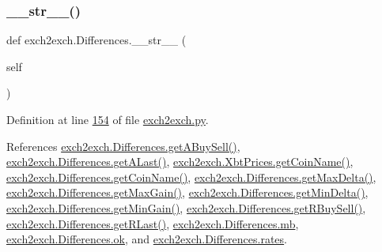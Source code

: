 \subsubsection{\texorpdfstring{\+\_\+\+\_\+str\+\_\+\+\_\+()}{\_\_str\_\_()}}
{\footnotesize\ttfamily def exch2exch.\+Differences.\+\_\+\+\_\+str\+\_\+\+\_\+ (\begin{DoxyParamCaption}\item[{}]{self }\end{DoxyParamCaption})}



Definition at line \hyperlink{exch2exch_8py_source_l00154}{154} of file \hyperlink{exch2exch_8py_source}{exch2exch.\+py}.



References \hyperlink{exch2exch_8py_source_l00139}{exch2exch.\+Differences.\+get\+A\+Buy\+Sell()}, \hyperlink{exch2exch_8py_source_l00145}{exch2exch.\+Differences.\+get\+A\+Last()}, \hyperlink{exch2exch_8py_source_l00088}{exch2exch.\+Xbt\+Prices.\+get\+Coin\+Name()}, \hyperlink{exch2exch_8py_source_l00151}{exch2exch.\+Differences.\+get\+Coin\+Name()}, \hyperlink{exch2exch_8py_source_l00130}{exch2exch.\+Differences.\+get\+Max\+Delta()}, \hyperlink{exch2exch_8py_source_l00136}{exch2exch.\+Differences.\+get\+Max\+Gain()}, \hyperlink{exch2exch_8py_source_l00127}{exch2exch.\+Differences.\+get\+Min\+Delta()}, \hyperlink{exch2exch_8py_source_l00133}{exch2exch.\+Differences.\+get\+Min\+Gain()}, \hyperlink{exch2exch_8py_source_l00142}{exch2exch.\+Differences.\+get\+R\+Buy\+Sell()}, \hyperlink{exch2exch_8py_source_l00148}{exch2exch.\+Differences.\+get\+R\+Last()}, \hyperlink{exch2exch_8py_source_l00108}{exch2exch.\+Differences.\+mb}, \hyperlink{exch2exch_8py_source_l00109}{exch2exch.\+Differences.\+ok}, and \hyperlink{exch2exch_8py_source_l00107}{exch2exch.\+Differences.\+rates}.


